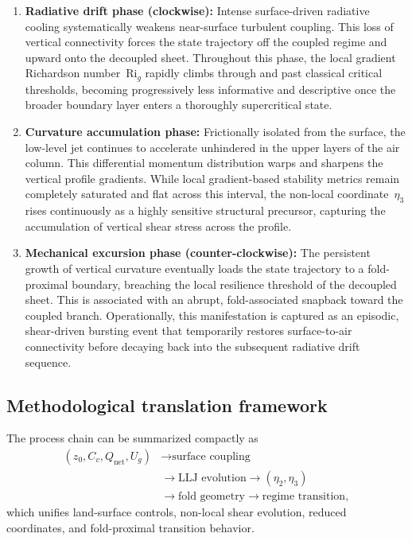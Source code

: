 \documentclass[12pt,a4paper]{article}
\newcommand{\Rig}{\mathrm{Ri}_g}
\begin{document}
\begin{enumerate}
  \item \textbf{Radiative drift phase (clockwise):} Intense surface-driven radiative cooling systematically weakens near-surface turbulent coupling. This loss of vertical connectivity forces the state trajectory off the coupled regime and upward onto the decoupled sheet. Throughout this phase, the local gradient Richardson number~$\Rig$ rapidly climbs through and past classical critical thresholds, becoming progressively less informative and descriptive once the broader boundary layer enters a thoroughly supercritical state.
  \item \textbf{Curvature accumulation phase:} Frictionally isolated from the surface, the low-level jet continues to accelerate unhindered in the upper layers of the air column. This differential momentum distribution warps and sharpens the vertical profile gradients. While local gradient-based stability metrics remain completely saturated and flat across this interval, the non-local coordinate~$\eta_3$ rises continuously as a highly sensitive structural precursor, capturing the accumulation of vertical shear stress across the profile.
  \item \textbf{Mechanical excursion phase (counter-clockwise):} The persistent growth of vertical curvature eventually loads the state trajectory to a fold-proximal boundary, breaching the local resilience threshold of the decoupled sheet. This is associated with an abrupt, fold-associated snapback toward the coupled branch. Operationally, this manifestation is captured as an episodic, shear-driven bursting event that temporarily restores surface-to-air connectivity before decaying back into the subsequent radiative drift sequence.
\end{enumerate}

\subsection{Methodological translation framework}

The process chain can be summarized compactly as
\begin{equation}
\begin{aligned}
(z_0, C_v, Q_{\text{net}}, U_g) &\rightarrow \text{surface coupling} \\
&\rightarrow \text{LLJ evolution} \rightarrow (\eta_2,\eta_3) \\
&\rightarrow \text{fold geometry} \rightarrow \text{regime transition},
\end{aligned}
\end{equation}
which unifies land-surface controls, non-local shear evolution, reduced coordinates, and fold-proximal transition behavior.
\end{document}
